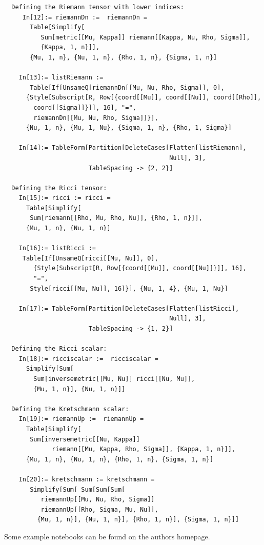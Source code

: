 \documentclass[10pt,twoside,notitlepage,a4paper,fleqn,openbib]{report}
\begin{document}
{\begin{verbatim}
  Defining the Riemann tensor with lower indices:
     In[12]:= riemannDn :=  riemannDn = 
       Table[Simplify[
          Sum[metric[[Mu, Kappa]] riemann[[Kappa, Nu, Rho, Sigma]], 
          {Kappa, 1, n}]], 
       {Mu, 1, n}, {Nu, 1, n}, {Rho, 1, n}, {Sigma, 1, n}]

    In[13]:= listRiemann := 
       Table[If[UnsameQ[riemannDn[[Mu, Nu, Rho, Sigma]], 0], 
      {Style[Subscript[R, Row[{coord[[Mu]], coord[[Nu]], coord[[Rho]], 
        coord[[Sigma]]}]], 16], "=", 
        riemannDn[[Mu, Nu, Rho, Sigma]]}],
      {Nu, 1, n}, {Mu, 1, Nu}, {Sigma, 1, n}, {Rho, 1, Sigma}]
    
    In[14]:= TableForm[Partition[DeleteCases[Flatten[listRiemann],
                                             Null], 3], 
                       TableSpacing -> {2, 2}]

  Defining the Ricci tensor:
    In[15]:= ricci := ricci = 
      Table[Simplify[
       Sum[riemann[[Rho, Mu, Rho, Nu]], {Rho, 1, n}]], 
      {Mu, 1, n}, {Nu, 1, n}]

    In[16]:= listRicci := 
     Table[If[UnsameQ[ricci[[Mu, Nu]], 0], 
        {Style[Subscript[R, Row[{coord[[Mu]], coord[[Nu]]}]], 16], 
        "=", 
       Style[ricci[[Mu, Nu]], 16]}], {Nu, 1, 4}, {Mu, 1, Nu}]

    In[17]:= TableForm[Partition[DeleteCases[Flatten[listRicci],
                                             Null], 3], 
                       TableSpacing -> {1, 2}]

  Defining the Ricci scalar:
    In[18]:= ricciscalar :=  ricciscalar = 
      Simplify[Sum[
        Sum[inversemetric[[Mu, Nu]] ricci[[Nu, Mu]], 
        {Mu, 1, n}], {Nu, 1, n}]]

  Defining the Kretschmann scalar:
    In[19]:= riemannUp :=  riemannUp = 
      Table[Simplify[
       Sum[inversemetric[[Nu, Kappa]] 
             riemann[[Mu, Kappa, Rho, Sigma]], {Kappa, 1, n}]], 
      {Mu, 1, n}, {Nu, 1, n}, {Rho, 1, n}, {Sigma, 1, n}]

    In[20]:= kretschmann := kretschmann = 
       Simplify[Sum[ Sum[Sum[Sum[
          riemannUp[[Mu, Nu, Rho, Sigma]] 
          riemannUp[[Rho, Sigma, Mu, Nu]], 
         {Mu, 1, n}], {Nu, 1, n}], {Rho, 1, n}], {Sigma, 1, n}]]
\end{verbatim}
}

Some example notebooks can be found on the authors homepage.

\end{document}
